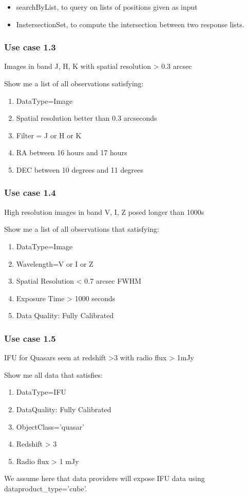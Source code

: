 \documentclass[11pt,a4paper]{ivoa}
\begin{document}
\begin{itemize}
\item searchByList, to query on lists of positions given as input
\item InstersectionSet, to compute the intersection between two response lists.
\end{itemize}
\subsubsection{Use case 1.3}
Images in band J, H, K with spatial resolution {\textgreater} 0.3 arcsec

Show me a list of all observations satisfying:

\begin{enumerate}
\item DataType=Image
\item Spatial resolution better than 0.3 arcseconds
\item Filter = J or H or K
\item RA between 16 hours and 17 hours
\item DEC between 10 degrees and 11 degrees
\end{enumerate}
\subsubsection[Use case 1.4 ]{Use case 1.4}
High resolution images in band V, I, Z posed longer than 1000s

Show me a list of all observations that satisfying:

\begin{enumerate}
\item DataType=Image
\item Wavelength=V or I or Z
\item Spatial Resolution {\textless} 0.7 arcsec FWHM
\item Exposure Time {\textgreater} 1000 seconds
\item Data Quality: Fully Calibrated
\end{enumerate}
\subsubsection[Use case 1.5]{Use case 1.5}
IFU for Quasars seen at redshift {\textgreater}3 with radio flux {\textgreater} 1mJy

Show me all data that satisfies:

\begin{enumerate}
\item DataType=IFU
\item DataQuality: Fully Calibrated
\item ObjectClass='quasar'
\item Redshift {\textgreater} 3
\item Radio flux {\textgreater} 1 mJy
\end{enumerate}
We assume here that data providers will expose IFU data using dataproduct\_type='cube'.
\end{document}
